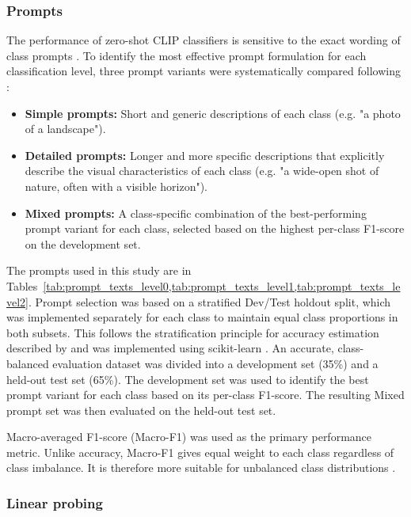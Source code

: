 \documentclass[11pt]{article}
\renewcommand{\_}{\textunderscore\allowbreak{}}
\begin{document}
\subsubsection{Prompts}
The performance of zero-shot CLIP classifiers is sensitive to the exact wording of class prompts \citep{yong_prompt_2023,malla_enhancing_2025,liao_mapping_2025}. To identify the most effective prompt formulation for each classification level, three prompt variants were systematically compared following \citet{liao_mapping_2025}:

\begin{itemize}
\item \textbf{Simple prompts:} Short and generic descriptions of each class (e.g. "a photo of a landscape"). \item \textbf{Detailed prompts:} Longer and more specific descriptions that explicitly describe the visual characteristics of each class (e.g. "a wide-open shot of nature, often with a visible horizon").
\item \textbf{Mixed prompts:} A class-specific combination of the best-performing prompt variant for each class, selected based on the highest per-class F1-score on the development set.
\end{itemize}

The prompts used in this study are in Tables~\ref{tab:prompt_texts_level0,tab:prompt_texts_level1,tab:prompt_texts_level2}. Prompt selection was based on a stratified Dev/Test holdout split, which was implemented separately for each class to maintain equal class proportions in both subsets. This follows the stratification principle for accuracy estimation described by \citet{kohavi_study_1995} and was implemented using scikit-learn \citep{pedregosa_scikit-learn_2011}. An accurate, class-balanced evaluation dataset was divided into a development set (35\%) and a held-out test set (65\%). The development set was used to identify the best prompt variant for each class based on its per-class F1-score. The resulting Mixed prompt set was then evaluated on the held-out test set.

Macro-averaged F1-score (Macro-F1) was used as the primary performance metric. Unlike accuracy, Macro-F1 gives equal weight to each class regardless of class imbalance. It is therefore more suitable for unbalanced class distributions \citep{liao_mapping_2025,sokolova_systematic_2009}.

\subsubsection{Linear probing}
\end{document}
